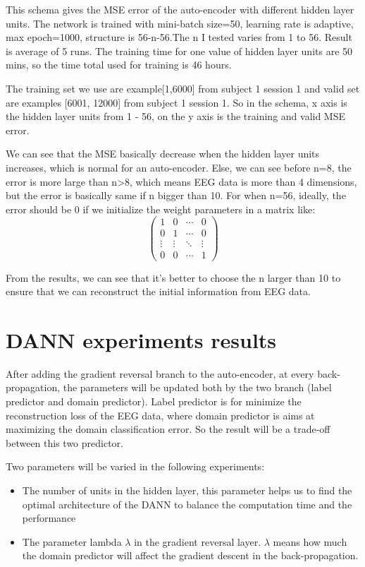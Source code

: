 This schema gives the MSE error of the auto-encoder with different hidden layer units. The network is trained with mini-batch size=50, learning rate is adaptive, max epoch=1000, structure is 56-n-56.The n I tested varies from 1 to 56. Result is average of 5 runs. The training time for one value of hidden layer units are 50 mins, so the time total used for training is 46 hours.

The training set we use are example[1,6000] from subject 1 session 1 and valid set are examples [6001, 12000] from subject 1 session 1. So in the schema, x axis is the hidden layer units from 1 - 56, on the y axis is the training and valid MSE error.

We can see that the MSE basically decrease when the hidden layer units increases, which is normal for an auto-encoder. Else, we can see before n=8, the error is more large than n>8, which means EEG data is more than 4 dimensions, but the error is basically same if n bigger than 10. For when n=56, ideally, the error should be 0 if we initialize the weight parameters in a matrix like:
\[ 
\begin{pmatrix}
1 & 0 & \cdots & 0 \\
0 & 1 & \cdots & 0 \\
\vdots  & \vdots  & \ddots & \vdots  \\
0 & 0 & \cdots & 1
\end{pmatrix} 
\]

From the results, we can see that it's better to choose the n larger than 10 to ensure that we can reconstruct the initial information from EEG data.

\section{DANN experiments results}
After adding the gradient reversal branch to the auto-encoder, at every back-propagation, the parameters will be updated both by the two branch (label predictor and domain predictor). Label predictor is for minimize the reconstruction loss of the EEG data, where domain predictor is aims at maximizing the domain classification error. So the result will be a trade-off between this two predictor.

Two parameters will be varied in the following experiments:
\begin{itemize}
	\item The number of units in the hidden layer, this parameter helps us to find the optimal architecture of the DANN to balance the computation time and the performance
	\item The parameter lambda $\lambda$ in the gradient reversal layer. $\lambda$ means how much the domain predictor will affect the gradient descent in the back-propagation.
\end{itemize}  

